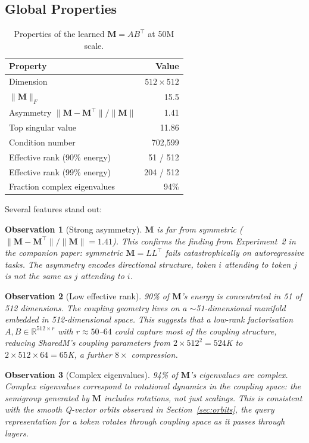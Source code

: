 \documentclass[11pt, a4paper]{article}
\newcommand{\M}{\mathbf{M}}
\newcommand{\R}{\mathbb{R}}
\theoremstyle{plain}
\newtheorem{observation}{Observation}
\theoremstyle{remark}
\begin{document}
\subsection{Global Properties}

\begin{table}[h]
\centering\small
\begin{tabular}{@{}lr@{}}
\toprule
\textbf{Property} & \textbf{Value} \\
\midrule
Dimension & $512 \times 512$ \\
$\|\M\|_F$ & 15.5 \\
Asymmetry $\|\M - \M^\top\| / \|\M\|$ & 1.41 \\
Top singular value & 11.86 \\
Condition number & 702{,}599 \\
Effective rank (90\% energy) & 51 / 512 \\
Effective rank (99\% energy) & 204 / 512 \\
Fraction complex eigenvalues & 94\% \\
\bottomrule
\end{tabular}
\caption{Properties of the learned $\M = AB^\top$ at 50M scale.}
\end{table}

Several features stand out:

\begin{observation}[Strong asymmetry]
$\M$ is far from symmetric ($\|\M - \M^\top\| / \|\M\| = 1.41$).
This confirms the finding from Experiment~2 in the companion paper: symmetric $\M = LL^\top$ fails catastrophically on autoregressive tasks.
The asymmetry encodes directional structure, token $i$ attending to token $j$ is not the same as $j$ attending to $i$.
\end{observation}

\begin{observation}[Low effective rank]
90\% of $\M$'s energy is concentrated in 51 of 512 dimensions.
The coupling geometry lives on a ${\sim}$51-dimensional manifold embedded in 512-dimensional space.
This suggests that a low-rank factorisation $A, B \in \R^{512 \times r}$ with $r \approx 50$--$64$ could capture most of the coupling structure, reducing SharedM's coupling parameters from $2 \times 512^2 = 524$K to $2 \times 512 \times 64 = 65$K, a further $8\times$ compression.
\end{observation}

\begin{observation}[Complex eigenvalues]
94\% of $\M$'s eigenvalues are complex.
Complex eigenvalues correspond to rotational dynamics in the coupling space: the semigroup generated by $\M$ includes rotations, not just scalings.
This is consistent with the smooth Q-vector orbits observed in Section~\ref{sec:orbits}, the query representation for a token rotates through coupling space as it passes through layers.
\end{observation}
\end{document}
